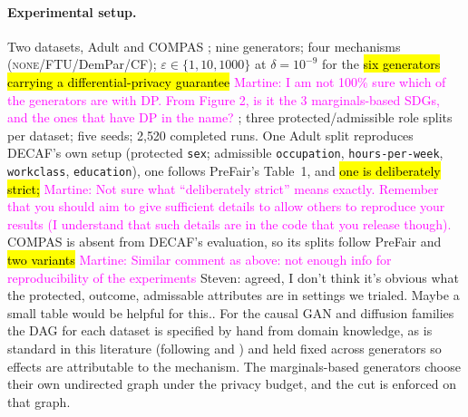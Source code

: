 \documentclass{article}
\newcommand{\martine}[1]{\textcolor{magenta}{Martine: #1}}
\newcommand{\s}[1]{\textcolor{Dandelion}{Steven: #1}}
\begin{document}
\paragraph{Experimental setup.}
Two datasets, Adult \citep{becker1996adult} and COMPAS
\citep{angwin2016machinebias}; nine generators; four mechanisms
(\textsc{none}/FTU/DemPar/CF); $\varepsilon \in \{1,10,1000\}$ at $\delta =
10^{-9}$ for the \hl{six generators carrying a differential-privacy guarantee} \martine{I am not 100\% sure which of the generators are with DP. From Figure 2, is it the 3 marginals-based SDGs, and the ones that have DP in the name?}
\citep{dwork2006calibrating}; three protected/admissible role splits per
dataset; five seeds; 2{,}520 completed runs. One Adult split reproduces
DECAF's own setup (protected \texttt{sex}; admissible \texttt{occupation},
\texttt{hours-per-week}, \texttt{workclass}, \texttt{education}), one
follows PreFair's Table~1, and \hl{one is deliberately strict;} \martine{Not sure what ``deliberately strict'' means exactly. Remember that you should aim to give sufficient details to allow others to reproduce your results (I understand that such details are in the code that you release though).} COMPAS is absent
from DECAF's evaluation, so its splits follow PreFair and \hl{two variants} \martine{Similar comment as above: not enough info for reproducibility of the experiments} \s{agreed, I don't think it's obvious what the protected, outcome, admissable attributes are in settings we trialed. Maybe a small table would be helpful for this.}. For
the causal GAN and diffusion families the DAG for each dataset is specified
by hand from domain knowledge, as is standard in this literature (following
\citet{kusner2017counterfactual} and \citet{zhang2017causalframework}) and
held fixed across generators so effects are attributable to the mechanism.
The marginals-based generators choose their own undirected graph under the
privacy budget, and the cut is enforced on that graph.
\end{document}
